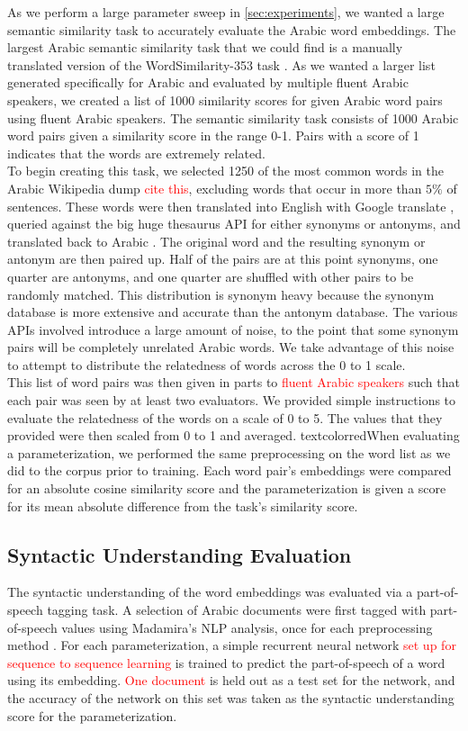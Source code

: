 As we perform a large parameter sweep in \ref{sec:experiments}, we wanted a large semantic similarity task to accurately evaluate the Arabic word embeddings. The largest Arabic semantic similarity task that we could find is a manually translated version of the WordSimilarity-353 task \cite{finkelstein:2001,hassan:2009}. As we wanted a larger list generated specifically for Arabic and evaluated by multiple fluent Arabic speakers, we created a list of 1000 similarity scores for given Arabic word pairs using fluent Arabic speakers. The semantic similarity task consists of 1000 Arabic word pairs given a similarity score in the range 0-1. Pairs with a score of 1 indicates that the words are extremely related.
\\
To begin creating this task, we selected 1250 of the most common words in the Arabic Wikipedia dump \textcolor{red}{cite this}, excluding words that occur in more than $5\%$ of sentences. These words were then translated into English with Google translate \cite{google:online}, queried against the big huge thesaurus API for either synonyms or antonyms, and translated back to Arabic \cite{bhl:online}. The original word and the resulting synonym or antonym are then paired up. Half of the pairs are at this point synonyms, one quarter are antonyms, and one quarter are shuffled with other pairs to be randomly matched. This distribution is synonym heavy because the synonym database is more extensive and accurate than the antonym database. The various APIs involved introduce a large amount of noise, to the point that some synonym pairs will be completely unrelated Arabic words. We take advantage of this noise to attempt to distribute the relatedness of words across the 0 to 1 scale.
\\
This list of word pairs was then given in parts to \textcolor{red}{fluent Arabic speakers} such that each pair was seen by at least two evaluators. We provided simple instructions to evaluate the relatedness of the words on a scale of 0 to 5. The values that they provided were then scaled from 0 to 1 and averaged. textcolor{red}{When evaluating a parameterization, we performed the same preprocessing on the word list as we did to the corpus prior to training.} Each word pair's embeddings were compared for an absolute cosine similarity score and the parameterization is given a score for its mean absolute difference from the task's similarity score.

\subsection{Syntactic Understanding Evaluation}

The syntactic understanding of the word embeddings was evaluated via a part-of-speech tagging task. A selection of Arabic documents were first tagged with part-of-speech values using Madamira's NLP analysis, once for each preprocessing method \cite{pasha:2014}. For each parameterization, a simple recurrent neural network \textcolor{red}{set up for sequence to sequence learning} is trained to predict the part-of-speech of a word using its embedding. \textcolor{red}{One document} is held out as a test set for the network, and the accuracy of the network on this set was taken as the syntactic understanding score for the parameterization.